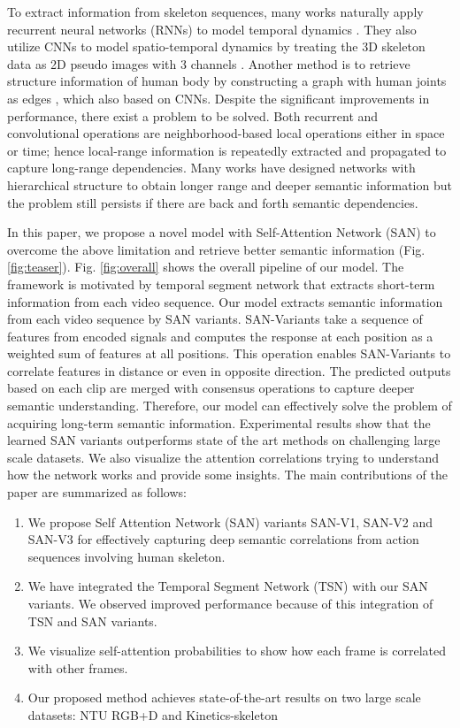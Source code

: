 \documentclass[10pt,twocolumn,letterpaper]{article}
\begin{document}
To extract information from skeleton sequences, many works naturally apply recurrent neural networks (RNNs) to model temporal dynamics \cite{STOA:PA-LSTM, STOA:TG_ST-LSTM, STOA:VA-LSTM}. They also utilize CNNs to model spatio-temporal dynamics by treating the 3D skeleton data as 2D pseudo images with 3 channels \cite{STOA:HCN, intro_cnn}. Another method is to retrieve structure information of human body by constructing a graph with human joints as edges \cite{STOA:stgcn}, which also based on CNNs.  
Despite the significant improvements in performance, there exist a problem to be solved.
Both recurrent and convolutional operations are neighborhood-based local operations \cite{intro_non-local} either in space or time; hence local-range information is repeatedly extracted and propagated to capture long-range dependencies.
Many works have designed networks with hierarchical structure \cite{STOA:H-RNN, STOA:ENS_TS-LSTM, cho2018spatio} to obtain longer range and deeper semantic information but the problem still persists if there are back and forth semantic dependencies.

In this paper, we propose a novel model with Self-Attention Network (SAN) to overcome the above limitation and retrieve better semantic information (Fig. \ref{fig:teaser}). 
Fig. \ref{fig:overall} shows the overall pipeline of our model.
The framework is motivated by temporal segment network \cite{intro_TSN} that extracts short-term information from each video sequence.
Our model extracts semantic information from each video sequence by SAN variants.
SAN-Variants take a sequence of features from encoded signals and computes the response at each position as a weighted sum of features at all positions. This operation enables SAN-Variants to correlate features in distance or even in opposite direction. 
The predicted outputs based on each clip are merged with consensus operations to capture deeper semantic understanding.
Therefore, our model can effectively solve the problem of acquiring long-term semantic information. 
Experimental results show that the learned SAN variants outperforms state of the art methods on challenging large scale datasets. 
We also visualize the attention correlations trying to understand how the network works and provide some insights.
The main contributions of the paper are summarized as follows:
\begin{enumerate}
    \itemsep-0.49em 
	\item We propose Self Attention Network (SAN) variants SAN-V1, SAN-V2 and SAN-V3 for effectively capturing deep semantic correlations from action sequences involving human skeleton. 
	\item We have integrated the Temporal Segment Network (TSN) with our SAN variants. We observed improved performance because of this integration of TSN and SAN variants.
	\item We visualize self-attention probabilities to show how each frame is correlated with other frames. 
	\item Our  proposed  method  achieves  state-of-the-art  results on two large scale datasets:  NTU RGB+D and Kinetics-skeleton
\end{enumerate}
\end{document}
